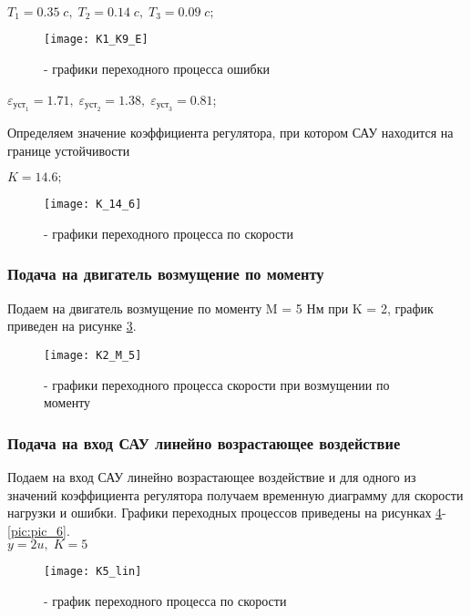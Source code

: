 \begin{center}
$T_1 = 0.35\;c,\; T_2= 0.14\;c,\; T_3 =0.09\;c ;$
\end{center}

\begin{figure}[H]
	\begin{center}
		\texttt{[image: K1\_K9\_E]}
		\caption{- графики переходного процесса ошибки} 
		\label{pic:pic_3} %
	\end{center}
\end{figure}

\begin{center}
$\varepsilon_{\text{уст}_1}=1.71,\;\varepsilon_{\text{уст}_2}=1.38,\;\varepsilon_{\text{уст}_3}=0.81$;
\end{center}


Определяем значение коэффициента регулятора, при котором САУ находится на границе устойчивости
\begin{center}
	$K = 14.6;$
\end{center}

\begin{figure}[H]
	\begin{center}
		\texttt{[image: K\_14\_6]}
		\caption{- графики переходного процесса по скорости} 
		\label{pic:pic_22} %
	\end{center}
\end{figure}

\subsubsection{Подача на двигатель возмущение по моменту}
Подаем на двигатель возмущение по моменту M = 5 Нм при K = 2, график приведен на рисунке \ref{pic:pic_4}.
\begin{figure}[H]
	\begin{center}
		\texttt{[image: K2\_M\_5]}
		\caption{- графики переходного процесса скорости при возмущении по моменту} 
		\label{pic:pic_4} %
	\end{center}
\end{figure}

\subsubsection{Подача на вход САУ линейно возрастающее воздействие}
Подаем на вход САУ линейно возрастающее воздействие и для одного из значений коэффициента регулятора получаем временную диаграмму для скорости нагрузки и ошибки. Графики переходных процессов приведены на рисунках \ref{pic:pic_5}-\ref{pic:pic_6}.\\
$y=2u,\; K = 5$
\begin{figure}[H]
	\begin{center}
		\texttt{[image: K5\_lin]}
		\caption{- график переходного процесса по скорости} 
		\label{pic:pic_5} %
	\end{center}
\end{figure}

